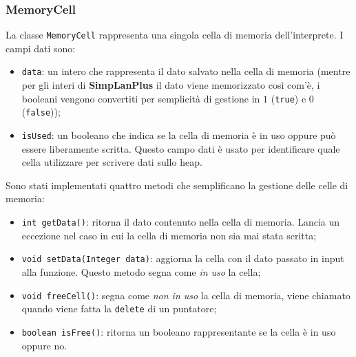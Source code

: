 \documentclass[../report.tex]{subfiles}
\begin{document}
\subsubsection{MemoryCell}\label{sss:memorycell}
La classe \verb|MemoryCell| rappresenta una singola cella di memoria dell'interprete. I campi dati sono: 
\begin{itemize}
    \item \verb|data|: un intero che rappresenta il dato salvato nella cella di memoria (mentre per gli interi di \textbf{SimpLanPlus} il dato viene memorizzato così com'è, i booleani vengono convertiti per semplicità di gestione in $1$ (\verb|true|) e $0$ (\verb|false|));
    \item \verb|isUsed|: un booleano che indica se la cella di memoria \`e in uso oppure pu\`o essere liberamente scritta. Questo campo dati \`e usato per identificare quale cella utilizzare per scrivere dati sullo heap.
\end{itemize}
Sono stati implementati quattro metodi che semplificano la gestione delle celle di memoria:
\begin{itemize}
    \item \verb|int getData()|: ritorna il dato contenuto nella cella di memoria. Lancia un eccezione nel caso in cui la cella di memoria non sia mai stata scritta;
    \item \verb|void setData(Integer data)|: aggiorna la cella con il dato passato in input alla funzione. Questo metodo segna come \textit{in uso} la cella; 
    \item \verb|void freeCell()|: segna come \textit{non in uso} la cella di memoria, viene chiamato quando viene fatta la \verb|delete| di un puntatore;
    \item \verb|boolean isFree()|: ritorna un booleano rappresentante se la cella \`e in uso oppure no.
\end{itemize}
\end{document}
